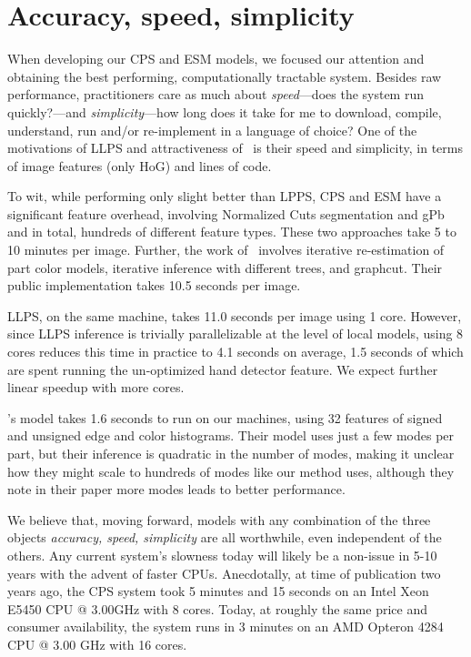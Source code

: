 \section{Accuracy, speed, simplicity}

When developing our CPS and ESM models, we focused our attention and obtaining 
the best performing, computationally tractable system.  Besides raw 
performance, practitioners care as much about {\em speed}---does the system run 
quickly?---and {\em simplicity}---how long does it take for me to download, 
compile, understand, run and/or re-implement in a language of choice?  One of 
the motivations of LLPS and attractiveness of~\citet{deva2011} is their speed 
and simplicity, in terms of image features (only HoG) and lines of code.

To wit, while performing only slight better than LPPS, CPS and ESM have a 
significant feature overhead, involving Normalized Cuts segmentation and gPb 
and in total, hundreds of different feature types.  These two approaches take 5 
to 10 minutes per image.  Further, the work of~\citet{eichner09} involves 
iterative re-estimation of part color models, iterative inference with 
different trees, and graphcut.  Their public implementation takes 10.5 seconds 
per image.

LLPS, on the same machine, takes 11.0 seconds per image using 1 core.  However, 
since LLPS inference is trivially parallelizable at the level of local models, 
using 8 cores reduces this time in practice to 4.1 seconds on average, 1.5 
seconds of which are spent running the un-optimized hand detector feature.  We 
expect further linear speedup with more cores.


\citet{deva2011}'s model takes 1.6 seconds to run on our machines, using 32 
features of signed and unsigned edge and color histograms.  Their model uses 
just a few modes per part, but their inference is quadratic in the number of 
modes, making it unclear how they might scale to hundreds of modes like our 
method uses, although they note in their paper more modes leads to better 
performance.

We believe that, moving forward, models with any combination of the three 
objects {\em accuracy, speed, simplicity} are all worthwhile, even independent 
of the others.  Any current system's slowness today will likely be a non-issue 
in 5-10 years with the advent of faster CPUs. Anecdotally, at time of 
publication two years ago, the CPS system took 5 minutes and 15 seconds on an 
Intel Xeon E5450 CPU @ 3.00GHz with 8 cores.  Today, at roughly the same price 
and consumer availability, the system runs in 3 minutes on an AMD Opteron 4284 
CPU @ 3.00 GHz with 16 cores.

